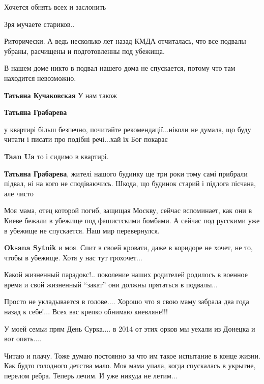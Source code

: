 \begin{itemize}
Хочется обнять всех и заслонить

Зря мучаете стариков..


Риторически. А ведь несколько лет назад КМДА отчиталась, что все подвалы
убраны, расчищены и подготовленны под убежища.

В нашем доме никто в подвал нашего дома не спускается, потому что там находится
невозможно.

\begin{itemize} %
\textbf{Татьяна Кучаковская} У нам також

\textbf{Татьяна Грабарева} 

у квартирі більш безпечно, почитайте рекомендації...ніколи не думала, що буду
читати і писати про подібні речі...хай їх Бог покарає

\textbf{Taan Ua} то і сидимо в квартирі.

\textbf{Татьяна Грабарева}, жителі нашого будинку ще три роки тому самі прибрали підвал, ні на
кого не сподіваючись. Шкода, що будинок старий і підлога пісчана, але чисто
\end{itemize} %


Моя мама, отец которой погиб, защищая Москву, сейчас вспоминает, как они в
Киеве бежали в убежище под фашистскими бомбами. А сейчас под русскими уже в
убежище не спускается. Наш мир перевернулся.

\textbf{Oksana Sytnik} и моя. Спит в своей кровати, даже в коридоре не хочет, не то, чтобы в убежище. Хотя у нас тут грохочет...


Какой жизненный парадокс!.. поколение наших родителей родилось в военное время и
свой жизненный \enquote{закат} они должны прятаться в подвалы...

Просто не укладывается в голове....
Хорошо что я свою маму забрала два года назад к себе!...
Всех вас крепко обнимаю киевляне!!!


У моей семьи прям День Сурка.... в 2014 от этих орков мы уехали из Донецка и
вот опять....


Читаю и плачу. Тоже думаю постоянно за что им такое испытание в конце жизни.
Как будто голодного детства мало. Моя мама упала, когда спускалась в укрытие,
перелом ребра. Теперь лечим. И уже никуда не летим...


\end{itemize}
